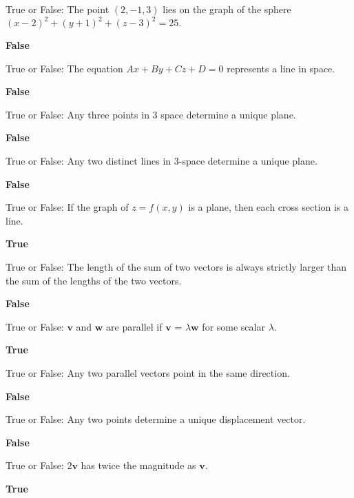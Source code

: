 \documentclass{exam}
\newcommand{\bv}{\mathbf{v}}
\newcommand{\bw}{\mathbf{w}}
\begin{document}
\begin{questions}
		\question True or False: The point $(2, -1, 3)$ lies on the graph of the sphere $(x - 2)^2 + (y + 1)^2 + (z - 3)^2 = 25.$
		 \begin{solution}
		 	\textbf{False}
		 \end{solution}
		
		\question True or False: The equation $Ax + By + Cz + D = 0$ represents a line in space. 
		 \begin{solution}
		 	\textbf{False}
		 \end{solution}
		
		\question True or False: Any three points in 3 space determine a unique plane.
		 \begin{solution}
		 	\textbf{False}
		 \end{solution}
		
		\question True or False: Any two distinct lines in 3-space determine a unique plane. 
		 \begin{solution}
		 	\textbf{False}
		 \end{solution}
		
		\question True or False: If the graph of $z=f(x,y)$ is a plane, then each cross section is a line.
		 \begin{solution}
		 	\textbf{True}
		 \end{solution}
		
		\question True or False: The length of the sum of two vectors is always strictly larger than the sum of the
		lengths of the two vectors. 
		 \begin{solution}
		 	\textbf{False}
		 \end{solution}
		
		\question True or False: $\bv$ and $\bw$ are parallel if $\bv$ = $\lambda \bw$ for some scalar $\lambda$.
		 \begin{solution}
		 	\textbf{True}
		 \end{solution}
		 
		\question True or False: Any two parallel vectors point in the same direction.
		 \begin{solution}
		 	\textbf{False}
		 \end{solution}
		 
		\question True or False: Any two points determine a unique displacement vector. 
		 \begin{solution}
		 	\textbf{False}
		 \end{solution}
		  
		\question True or False: 2$\bv$ has twice the magnitude as $\bv$.
		 \begin{solution}
		 	\textbf{True}
		 \end{solution}
		  

\end{questions}
\end{document}
